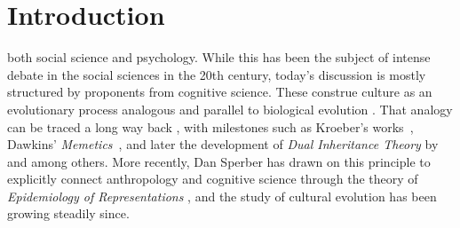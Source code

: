 
\section{Introduction} %

\begin{new}

 both social science and psychology. While this  has been the subject of intense debate in the social sciences in the 20th century, today's discussion is mostly structured by proponents from cognitive science.
These construe culture as an evolutionary process analogous and parallel to biological evolution .
That analogy can  be traced a long way back , with milestones such as Kroeber's works~\citeyearpar{kroeber_nature_1952}, Dawkins' \emph{Memetics}~, and later the development of \emph{Dual Inheritance Theory} by \citet{boyd_culture_1985} and \citet{cavalli-sforza_cultural_1981} among others.
More recently, Dan Sperber has drawn on this principle to explicitly connect anthropology and cognitive science through the theory of \emph{Epidemiology of Representations} \citep{sperber_explaining_1996}, and the study of cultural evolution has been growing steadily since.


\end{new}
